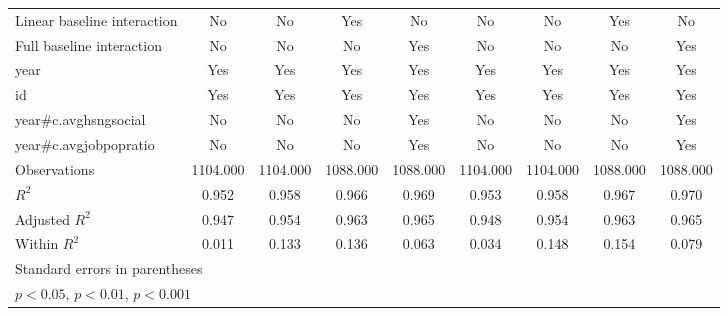 {\begin{tabular}{l*{8}{c}}
\addlinespace
Linear baseline interaction &     {No}         &     {No}         &    {Yes}         &     {No}         &     {No}         &     {No}         &    {Yes}         &     {No}         \\
\addlinespace
Full baseline interaction&     {No}         &     {No}         &     {No}         &    {Yes}         &     {No}         &     {No}         &     {No}         &    {Yes}         \\
\addlinespace
year            &    {Yes}         &    {Yes}         &    {Yes}         &    {Yes}         &    {Yes}         &    {Yes}         &    {Yes}         &    {Yes}         \\
\addlinespace
id              &    {Yes}         &    {Yes}         &    {Yes}         &    {Yes}         &    {Yes}         &    {Yes}         &    {Yes}         &    {Yes}         \\
\addlinespace
year#c.avghsngsocial&     {No}         &     {No}         &     {No}         &    {Yes}         &     {No}         &     {No}         &     {No}         &    {Yes}         \\
\addlinespace
year#c.avgjobpopratio&     {No}         &     {No}         &     {No}         &    {Yes}         &     {No}         &     {No}         &     {No}         &    {Yes}         \\
\midrule
Observations    & 1104.000         & 1104.000         & 1088.000         & 1088.000         & 1104.000         & 1104.000         & 1088.000         & 1088.000         \\
\(R^{2}\)       &    0.952         &    0.958         &    0.966         &    0.969         &    0.953         &    0.958         &    0.967         &    0.970         \\
Adjusted \(R^{2}\)&    0.947         &    0.954         &    0.963         &    0.965         &    0.948         &    0.954         &    0.963         &    0.965         \\
Within \(R^{2}\)&    0.011         &    0.133         &    0.136         &    0.063         &    0.034         &    0.148         &    0.154         &    0.079         \\
\bottomrule
\multicolumn{9}{l}{\footnotesize Standard errors in parentheses}\\
\multicolumn{9}{l}{\footnotesize \sym{*} \(p<0.05\), \sym{**} \(p<0.01\), \sym{***} \(p<0.001\)}\\
\end{tabular}
}
